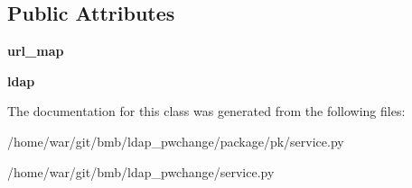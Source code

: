 \subsection*{Public Attributes}
\begin{DoxyCompactItemize}
\item 
\hypertarget{classservice_1_1PwChangeServer_a79c4db6ac155df4b35e5c9c93fe3ce2c}{{\bfseries url\-\_\-map}}\label{classservice_1_1PwChangeServer_a79c4db6ac155df4b35e5c9c93fe3ce2c}

\item 
\hypertarget{classservice_1_1PwChangeServer_ad9074b7e33eeb288ad9696f7acd657fd}{{\bfseries ldap}}\label{classservice_1_1PwChangeServer_ad9074b7e33eeb288ad9696f7acd657fd}

\end{DoxyCompactItemize}


The documentation for this class was generated from the following files\-:\begin{DoxyCompactItemize}
\item 
/home/war/git/bmb/ldap\-\_\-pwchange/package/pk/service.\-py\item 
/home/war/git/bmb/ldap\-\_\-pwchange/service.\-py\end{DoxyCompactItemize}
